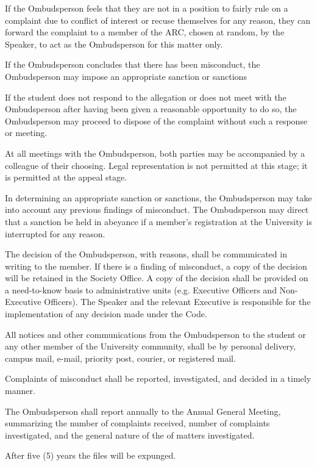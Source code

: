 \begin{longenum}[ label*=\arabic*., align=left]
\begin{longenum}[ label*=\arabic*., align=left]
           \begin{longenum}[ label*=\arabic*., align=left]
           \item If the Ombudsperson feels that they are not in a position to fairly rule on a complaint  due  to  conflict  of  interest  or  recuse themselves for any reason, they can forward  the  complaint  to  a  member  of  the  ARC,  chosen  at  random,  by  the Speaker, to act as the Ombudsperson for this matter only. 
           \end{longenum}
           \item If the Ombudsperson concludes that there has been misconduct, the Ombudsperson may impose an appropriate sanction or sanctions
           \item If  the  student  does  not  respond  to  the  allegation  or  does  not  meet  with  the Ombudsperson   after   having   been   given   a   reasonable   opportunity   to   do   so,   the Ombudsperson  may  proceed  to  dispose  of  the  complaint  without  such  a  response  or meeting.
           \item At  all  meetings  with  the  Ombudsperson,  both  parties  may  be  accompanied  by  a colleague  of  their  choosing.  Legal  representation  is  not  permitted  at  this  stage;  it  is permitted at the appeal stage.
          \item In determining an appropriate sanction or sanctions, the Ombudsperson may take into account  any  previous  findings  of  misconduct.  The  Ombudsperson  may  direct  that  a sanction be held in abeyance if a member's registration at the University is interrupted for any reason.
           \item The decision of the Ombudsperson, with reasons, shall be communicated in writing to the member. If there is a finding of misconduct, a copy of the decision will be retained in the  Society  Office.  A  copy  of  the  decision  shall  be  provided  on  a  need-to-know  basis  to administrative  units  (e.g.  Executive  Officers  and  Non-Executive  Officers).  The  Speaker and  the  relevant  Executive  is  responsible  for  the  implementation  of  any  decision  made under the Code.
          \item All notices and other communications from the Ombudsperson to the student or any other member of the University community, shall be by personal delivery, campus mail, e-mail, priority post, courier, or registered mail. 
          \item Complaints  of  misconduct  shall  be  reported,  investigated,  and  decided  in  a  timely manner.
          \item The  Ombudsperson  shall  report  annually  to  the  Annual General Meeting,  summarizing  the  number  of complaints received, number of complaints investigated, and the general nature of the of matters investigated.
          \item After five (5) years the files will be expunged.
   

\end{longenum}
\end{longenum}
